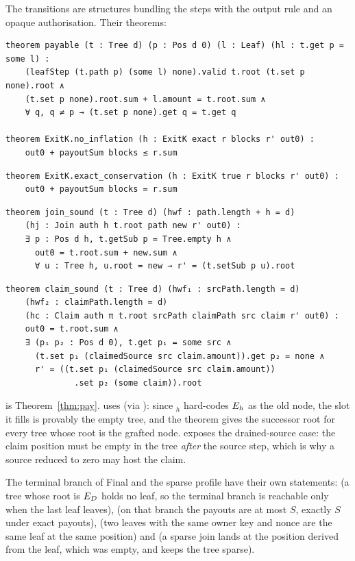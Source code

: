 The transitions are structures bundling the steps with the output rule
and an opaque authorisation. Their theorems:

\iffullversion\else
\begin{lstlisting}
theorem payable (t : Tree d) (p : Pos d 0) (l : Leaf) (hl : t.get p = some l) :
    (leafStep (t.path p) (some l) none).valid t.root (t.set p none).root ∧
    (t.set p none).root.sum + l.amount = t.root.sum ∧
    ∀ q, q ≠ p → (t.set p none).get q = t.get q

theorem ExitK.no_inflation (h : ExitK exact r blocks r' out0) :
    out0 + payoutSum blocks ≤ r.sum
\end{lstlisting}
\fi
\begin{lstlisting}
theorem ExitK.exact_conservation (h : ExitK true r blocks r' out0) :
    out0 + payoutSum blocks = r.sum
\end{lstlisting}
\iffullversion\else
\begin{lstlisting}
theorem join_sound (t : Tree d) (hwf : path.length + h = d)
    (hj : Join auth h t.root path new r' out0) :
    ∃ p : Pos d h, t.getSub p = Tree.empty h ∧
      out0 = t.root.sum + new.sum ∧
      ∀ u : Tree h, u.root = new → r' = (t.setSub p u).root
\end{lstlisting}
\fi
\begin{lstlisting}
theorem claim_sound (t : Tree d) (hwf₁ : srcPath.length = d)
    (hwf₂ : claimPath.length = d)
    (hc : Claim auth π t.root srcPath claimPath src claim r' out0) :
    out0 = t.root.sum ∧
    ∃ (p₁ p₂ : Pos d 0), t.get p₁ = some src ∧
      (t.set p₁ (claimedSource src claim.amount)).get p₂ = none ∧
      r' = ((t.set p₁ (claimedSource src claim.amount))
              .set p₂ (some claim)).root
\end{lstlisting}

 is Theorem~\ref{thm:pay}.  uses
 (via ): since $_h$
hard-codes $E_h$ as the old node, the slot it fills is provably the
empty tree, and the theorem gives the successor root for every tree whose
root is the grafted node.  exposes the drained-source
case: the claim position must be empty in the tree \emph{after} the source
step, which is why a source reduced to zero may host the claim.

The terminal branch of \textsf{Final} and the sparse profile have their
own statements:  (a tree whose root is
$E_D$ holds no leaf, so the terminal branch is reachable only when the
last leaf leaves),  (on that branch
the payouts are at most $S$, exactly $S$ under exact payouts),
 (two leaves with the same owner key and nonce
are the same leaf at the same position) and  (a
sparse join lands at the position derived from the leaf, which was
empty, and keeps the tree sparse).

